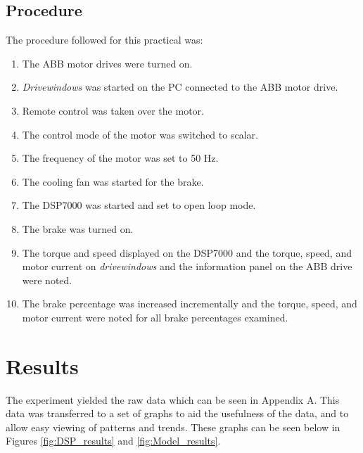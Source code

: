\documentclass[12pt]{report}
\begin{document}
	\section{Procedure}
	The procedure followed for this practical was:
	\begin{enumerate}
		\item{The ABB motor drives were turned on.}
		\item{\textit{Drivewindows} was started on the PC connected to the ABB motor drive.}
		\item{Remote control was taken over the motor.}
		\item{The control mode of the motor was switched to scalar.}
		\item{The frequency of the motor was set to 50 Hz.}
		\item{The cooling fan was started for the brake.}
		\item{The DSP7000 was started and set to open loop mode.}
		\item{The brake was turned on.}
		\item{The torque and speed displayed on the DSP7000 and the torque, speed, and motor current on \textit{drivewindows} and the information panel on the ABB drive were noted.}
		\item{The brake percentage was increased incrementally and the torque, speed, and motor current were noted for all brake percentages examined.}
	\end{enumerate}
	
	
	\chapter{Results}
	
	The experiment yielded the raw data which can be seen in Appendix A. This data was transferred to a set of graphs to aid the usefulness of the data, and to allow easy viewing of patterns and trends. These graphs can be seen below in Figures \ref{fig:DSP_results} and \ref{fig:Model_results}.
	
\end{document}
